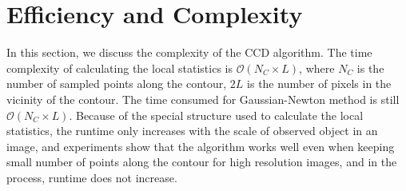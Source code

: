 \section{Efficiency and Complexity}
\label{sec:eff}
In this section, we discuss the complexity of the CCD algorithm. 
The time complexity of calculating the local statistics is
$\mathcal{O}(N_{C}\times L)$, where $N_{C}$ is the number of sampled
points along the contour, $2L$ is the number of pixels in the vicinity
of the contour. The time consumed for Gaussian-Newton method is still
$\mathcal{O}(N_{C}\times L)$. Because of the special structure used to
calculate the local statistics, the runtime only increases with the
scale of observed object in an image, and experiments show that the algorithm
works well even when keeping small number of points along the contour for
high resolution images, and in the process, runtime does not increase.

